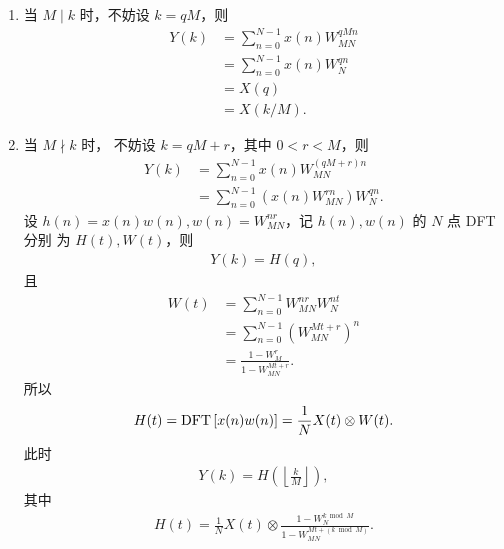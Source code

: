 \begin{solution}
\begin{enumerate}[label=(\arabic*)]
            \begin{enumerate}
                \item 当 $M \mid k$ 时，不妨设 $k = qM$，则
                    \begin{align*}
                        Y(k) & = \sum_{n = 0}^{N - 1}x(n)W_{MN}^{qMn} \\
                        & = \sum_{n = 0}^{N - 1}x(n)W_N^{qn} \\
                        & = X(q) \\
                        & = X(k / M).
                    \end{align*}
                \item 当 $M \nmid k$ 时， 不妨设 $k = qM + r$，其中 $0 < r < M$，则
                    \begin{align*}
                        Y(k) & = \sum_{n = 0}^{N - 1}x(n)W_{MN}^{(qM + r)n} \\
                        & = \sum_{n = 0}^{N - 1}\left(x(n)W_{MN}^{rn}\right)W_N^{qn}.
                    \end{align*}
                    设 $h(n) = x(n)w(n), w(n) = W_{MN}^{nr}$，记 $h(n), w(n)$ 的 $N$ 点 DFT 分别
                    为 $H(t), W(t)$，则
                    \begin{align*}
                        Y(k) = H(q),
                    \end{align*}
                    且
                    \begin{align*}
                        W(t) & = \sum_{n = 0}^{N - 1}W_{MN}^{nr}W_N^{nt} \\
                        & = \sum_{n = 0}^{N - 1}\left(W_{MN}^{Mt+r}\right)^n \\
                        & = \frac{1 - W_M^r}{1 - W_{MN}^{Mt+r}}.
                    \end{align*}
                    所以
                    \begin{align*}
                        H(t) = \mathrm{DFT}\left[x(n)w(n)\right] = \frac{1}{N}X(t) \otimes W(t).
                    \end{align*}
                    此时
                    \begin{align*}
                        Y(k) = H\left(\left\lfloor\frac{k}{M}\right\rfloor\right),
                    \end{align*}
                    其中
                    \begin{align*}
                        H(t) = \frac{1}{N}X(t) \otimes \frac{1 - W_N^{k \bmod M}}{1 - W_{MN}^{Mt + (k\bmod M)}}.

\end{align*}
\end{enumerate}
\end{enumerate}
\end{solution}
